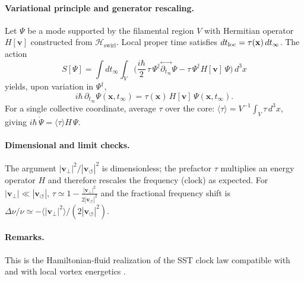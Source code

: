 \documentclass[10pt,reprint,aps,onecolumn,nofootinbib]{revtex4-2}
\begin{document}
    \paragraph{Variational principle and generator rescaling.}
        Let \(\Psi\) be a mode supported by the filamental region \(V\) with Hermitian operator
        \(H[\mathbf{v}]\) constructed from \(\mathcal{H}_{\text{swirl}}\).
        Local proper time satisfies \(dt_{\rm loc}=\tau(\mathbf{x})\,dt_\infty\). The action
        \[
            S[\Psi]=\int dt_{\infty}\!\!\int_V \Big(
            \frac{i\hbar}{2}\,\tau\,\Psi^\dagger\!\stackrel{\leftrightarrow}{\partial_{t_\infty}}\!\Psi
            -\tau\,\Psi^\dagger H[\mathbf{v}]\,\Psi\Big)\,d^{3}x
        \]
        yields, upon variation in \(\Psi^\dagger\),
        \begin{equation}
        i\hbar\,\partial_{t_\infty}\Psi(\mathbf{x},t_\infty)
        =\tau(\mathbf{x})\,H[\mathbf{v}]\,\Psi(\mathbf{x},t_\infty).
        \end{equation}
        For a single collective coordinate, average \(\tau\) over the core:
        \(\langle\tau\rangle=V^{-1}\!\int_V \tau\,d^3x\), giving
        \(i\hbar\,\dot\Psi=\langle\tau\rangle H\,\Psi\).

    \paragraph{Dimensional and limit checks.}
        The argument \( |\mathbf{v}_\perp|^{2}/|\mathbf{v}_{\!\boldsymbol{\circlearrowleft}}|^{2}\) is dimensionless; the prefactor \(\tau\) multiplies an energy operator \(H\) and therefore rescales the frequency (clock) as expected. For \(|\mathbf{v}_\perp|\ll |\mathbf{v}_{\!\boldsymbol{\circlearrowleft}}|\),
        \(\tau\simeq 1-\tfrac{|\mathbf{v}_\perp|^{2}}{2|\mathbf{v}_{\!\boldsymbol{\circlearrowleft}}|^{2}}\) and the fractional frequency shift is
        \(\Delta\nu/\nu\simeq-\langle|\mathbf{v}_\perp|^{2}\rangle/(2|\mathbf{v}_{\!\boldsymbol{\circlearrowleft}}|^{2})\).

    \paragraph{Remarks.}
        This is the Hamiltonian‐fluid realization of the SST clock law compatible with
        \cite{Salmon1988,Morrison1998} and with local vortex energetics
        \cite{Saffman1992,Batchelor1967,LandauFM}.


\end{document}
